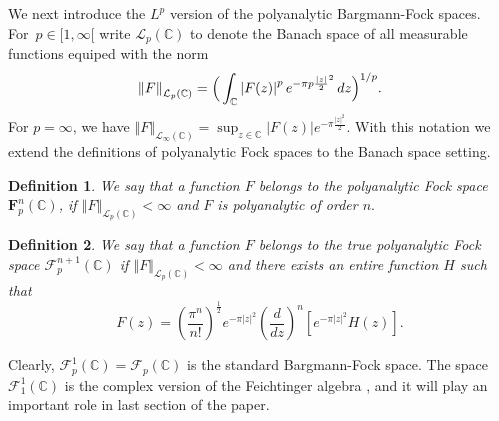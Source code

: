 \documentclass[12pt]{amsart}
\theoremstyle{plain}
\newtheorem{definition}{Definition}
\numberwithin{equation}{section}
\begin{document}
We next introduce the $L^{p}$ version of the polyanalytic Bargmann-Fock
spaces. For\ $p\in \lbrack 1,\infty \lbrack $ write $\mathcal{L}_{p}(%
\mathbb{C}
)$ to denote the Banach space of all measurable functions equiped with the
norm 
\begin{equation*}
\left\Vert F\right\Vert _{\mathcal{L}_{p}(%
\mathbb{C}
)}=\Big(\int_{%
\mathbb{C}
}\left\vert F(z)\right\vert ^{p}e^{-\pi p\frac{\left\vert z\right\vert }{2}%
^{2}}\, dz \Big) ^{1/p} \text{.}
\end{equation*}%
For $p=\infty $, we have $\left\Vert F\right\Vert _{\mathcal{L}_{\infty }(%
\mathbb{C}
)}=\sup_{z\in 
\mathbb{C}
}\left\vert F(z)\right\vert e^{-\pi \frac{\left\vert z\right\vert ^{2}}{2}}.$
With this notation we extend the definitions of polyanalytic Fock spaces to
the Banach space setting.

\begin{definition}
We say that a function $F$ belongs to the \emph{polyanalytic Fock space} $%
\mathbf{F}_{p}^{n}\left( 
\mathbb{C}
\right) $, if $\left\Vert F\right\Vert _{\mathcal{L}_{p}(%
\mathbb{C}
)}<\infty $ and $F$ is polyanalytic of order $n.$
\end{definition}

\begin{definition}
We say that a function $F$ belongs to the \emph{true polyanalytic Fock space}
$\mathcal{F}_{p}^{n+1}(%
\mathbb{C}
)$ if $\left\Vert F\right\Vert _{\mathcal{L}_{p}(%
\mathbb{C}
)}<\infty $ and there exists an entire function $H$ such that 
\begin{equation*}
F(z)=\left( \frac{\pi ^{n}}{n!}\right) ^{\frac{1}{2}}e^{-\pi \left\vert
z\right\vert ^{2}}\left( \frac{d}{dz}\right) ^{n}\left[ e^{-\pi \left\vert
z\right\vert ^{2}}H(z)\right] .
\end{equation*}
\end{definition}

Clearly, $\mathcal{F}_{p}^{1}(%
\mathbb{C}
)=\mathcal{F}_{p}(%
\mathbb{C}
)$ is the standard Bargmann-Fock space. The space $\mathcal{F}_{1}^1(%
\mathbb{C}
)$ is the complex version of the Feichtinger algebra \cite{Fei,FeiZim}, and
it will play an important role in last section of the paper.
\end{document}
